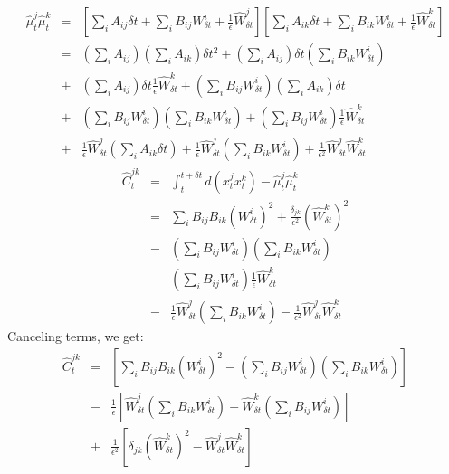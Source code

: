 \documentclass[12pt]{article}
\begin{document}
\begin{eqnarray}
\hat{\mu}_t^j \hat{\mu}_t^k &=& \left[ \sum_i A_{ij} \delta t + \sum_i B_{ij} W_{\delta t}^i + \frac{1}{\epsilon} \hat{W}_{\delta t}^j \right] \left[ \sum_i A_{ik} \delta t + \sum_i B_{ik} W_{\delta t}^i + \frac{1}{\epsilon} \hat{W}_{\delta t}^k \right] \\
&=& \left( \sum_i A_{ij} \right) \left( \sum_i A_{ik} \right) \delta t^2
+ \left( \sum_i A_{ij} \right) \delta t \left( \sum_i B_{ik} W_{\delta t}^i \right) \\
&+& \left( \sum_i A_{ij} \right) \delta t \frac{1}{\epsilon} \hat{W}_{\delta t}^k
+ \left( \sum_i B_{ij} W_{\delta t}^i \right) \left( \sum_i A_{ik} \right) \delta t \\
&+& \left( \sum_i B_{ij} W_{\delta t}^i \right) \left( \sum_i B_{ik} W_{\delta t}^i \right)
+ \left( \sum_i B_{ij} W_{\delta t}^i \right) \frac{1}{\epsilon} \hat{W}_{\delta t}^k \\
&+& \frac{1}{\epsilon} \hat{W}_{\delta t}^j \left( \sum_i A_{ik} \delta t \right) 
+ \frac{1}{\epsilon} \hat{W}_{\delta t}^j \left( \sum_i B_{ik} W_{\delta t}^i \right) 
+ \frac{1}{\epsilon^2} \hat{W}_{\delta t}^j \hat{W}_{\delta t}^k
\end{eqnarray}
%
\begin{eqnarray}
\hat{C}_{t}^{jk} 
&=& \int_t^{t + \delta t} d(x_t^j x_t^k)  - \hat{\mu}_t^j \hat{\mu}_t^k \\
&=& \sum_i B_{ij} B_{ik} \left(W_{\delta t}^i\right)^2  
+ \frac{\delta_{jk}}{\epsilon^2} (\hat{W}_{\delta t}^k)^2 \\
&-& \left( \sum_i B_{ij} W_{\delta t}^i \right) \left( \sum_i B_{ik} W_{\delta t}^i \right) \\
&-& \left( \sum_i B_{ij} W_{\delta t}^i \right) \frac{1}{\epsilon} \hat{W}_{\delta t}^k \\
&-& \frac{1}{\epsilon} \hat{W}_{\delta t}^j \left( \sum_i B_{ik} W_{\delta t}^i \right) 
- \frac{1}{\epsilon^2} \hat{W}_{\delta t}^j \hat{W}_{\delta t}^k 
\end{eqnarray}
%
Canceling terms, we get:
\begin{eqnarray}
\hat{C}_{t}^{jk} 
&=& \left[\sum_i B_{ij} B_{ik} \left(W_{\delta t}^i\right)^2 - \left( \sum_i B_{ij} W_{\delta t}^i \right) \left( \sum_i B_{ik} W_{\delta t}^i \right) \right] \\
&-& \frac{1}{\epsilon} \left[\hat{W}_{\delta t}^j \left( \sum_i B_{ik} W_{\delta t}^i \right) + \hat{W}_{\delta t}^k \left( \sum_i B_{ij} W_{\delta t}^i \right) \right] \\
&+& \frac{1}{\epsilon^2} \left[ \delta_{jk} (\hat{W}_{\delta t}^k)^2 - \hat{W}_{\delta t}^j \hat{W}_{\delta t}^k \right]
\end{eqnarray}
\end{document}
